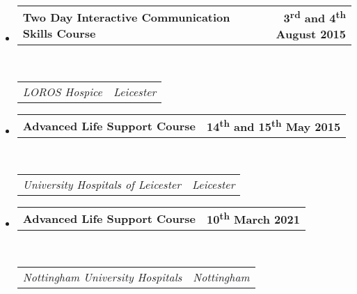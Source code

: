 \documentclass{article}
\makeatletter
\newcommand{\headerrow}[2]
{\begin{tabular*}{\linewidth}{l@{\extracolsep{\fill}}r}
	#1 &
	#2 \\
\end{tabular*}}
\makeatother
\begin{document}
\begin{itemize}
	\item
	\headerrow
		{\textbf{Two Day Interactive Communication Skills Course}}
		{\textbf{3\textsuperscript{rd} and 4\textsuperscript{th} August 2015}}
	\\
	\headerrow
		{\emph{LOROS Hospice}}
		{\emph{Leicester}}

	\item
	\headerrow
		{\textbf{Advanced Life Support Course}}
		{\textbf{14\textsuperscript{th} and 15\textsuperscript{th} May 2015}}
	\\
	\headerrow
		{\emph{University Hospitals of Leicester}}
		{\emph{Leicester}}
	
	\item
	\headerrow
		{\textbf{Advanced Life Support Course}}
		{\textbf{10\textsuperscript{th} March 2021}}
	\\
	\headerrow
		{\emph{Nottingham University Hospitals}}
		{\emph{Nottingham}}

\end{itemize}
\end{document}
